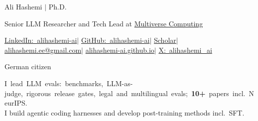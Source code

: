 \documentclass[11pt,a4paper]{moderncv}
\newcommand{\cvbodysize}{\fontsize{10}{12.6}\selectfont}
\begin{document}
{\centering
    {\Huge Ali Hashemi $|$ Ph.D.\par}
    \vspace{1.8mm}
    {\large Senior LLM Researcher and Tech Lead at \href{https://multiversecomputing.com/}{Multiverse Computing}\par}
    \vspace{1.6mm}
    {\footnotesize
    \href{https://www.linkedin.com/in/alihashemi-ai}{\mbox{LinkedIn: alihashemi-ai}}\enspace$|$\enspace
    \href{https://github.com/AliHashemi-ai}{\mbox{GitHub: alihashemi-ai}}\enspace$|$\enspace
    \href{https://scholar.google.com/citations?user=rCcFTFgAAAAJ&hl=en}{\mbox{Scholar}}\enspace$|$\enspace
    \href{mailto:alihashemi.ee@gmail.com}{\mbox{alihashemi.ee@gmail.com}}\enspace$|$\enspace
    \href{https://alihashemi-ai.github.io}{\mbox{alihashemi-ai.github.io}}\enspace$|$\enspace
    \href{https://x.com/alihashemi_ai}{\mbox{X: alihashemi\_ai}}\par}
    \vspace{0.8mm}
    {\footnotesize German citizen\par}
    \vspace{3.2mm}
    {\cvbodysize
    \mbox{I lead LLM evals: benchmarks, LLM-as-judge, rigorous release gates, legal and multilingual evals; \textbf{10+} papers incl.\ NeurIPS.}\\
    I build agentic coding harnesses and develop post-training methods incl.\ SFT.\par}
}
\vspace{4mm}
\nobreak %
\end{document}
